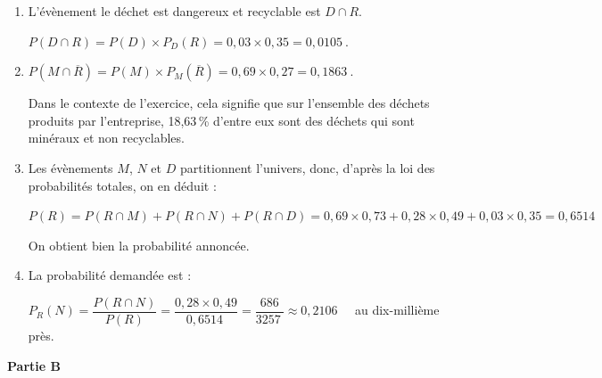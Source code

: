 \documentclass[10pt]{article}
\providecommand{\np}[2][]{{#2~#1}}
\begin{document}
\begin{enumerate}
\item L'évènement \og le déchet est dangereux et recyclable \fg{} est $D \cap R$.

$P(D \cap R) = P(D) \times P_{D}(R) = 0,03 \times 0,35 = \np{0,0105}$.

\item $P\left(M \cap \overline{R}\right) = P(M) \times P_{M}\left(\overline{R}\right) = 0,69 \times 0,27 = \np{0,1863} $.

Dans le contexte de l'exercice, cela signifie que sur l'ensemble des déchets produits par l'entreprise, 18,63\,\% d'entre eux sont des déchets qui sont minéraux et non recyclables.

\item Les évènements $M$, $N$ et $D$ partitionnent l'univers, donc, d'après la loi des probabilités totales, on en déduit :

$P(R) = P(R \cap M) + P(R \cap N) + P(R \cap D) = 0,69 \times 0,73 + 0,28 \times 0,49 + 0,03 \times 0,35 = \np{0,6514}$

On obtient bien la probabilité annoncée.

\item La probabilité demandée est :

$ P_{R}(N) = \dfrac{P(R \cap N)}{P(R)} = \dfrac{0,28 \times 0,49}{\np{0,6514}} = \dfrac{686}{\np{3257}}\approx \np{0,2106}$ ~ au dix-millième près.

\end{enumerate}

\medskip

\textbf{Partie B}

\medskip
\end{document}
